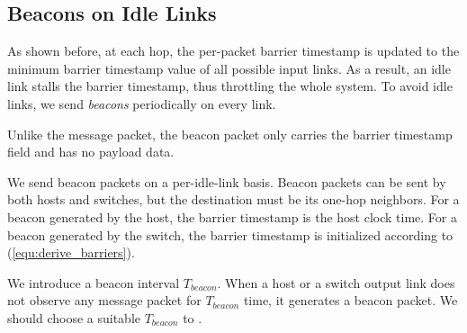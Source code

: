 \subsection{Beacons on Idle Links}
\label{sec:beacon}

As shown before, at each hop, the per-packet barrier timestamp is updated to the minimum barrier timestamp value of all possible input links.
As a result, an idle link stalls the barrier timestamp, thus throttling the whole system.
To avoid idle links, we send \textit{beacons} periodically on every link.



 Unlike the message packet, the beacon packet only carries the barrier timestamp field and has no payload data. %

We send beacon packets on a per-idle-link basis.
Beacon packets can be sent by both hosts and switches,
but the destination must be its one-hop neighbors.
For a beacon generated by the host, the barrier timestamp is the host clock time. For a beacon generated by the switch, the barrier timestamp is initialized according to (\ref{equ:derive_barriers}).

We introduce a beacon interval $T_{beacon}$. When a host or a switch output link does not observe any message packet for $T_{beacon}$ time, it generates a beacon packet. We should choose a suitable $T_{beacon}$ to . 

